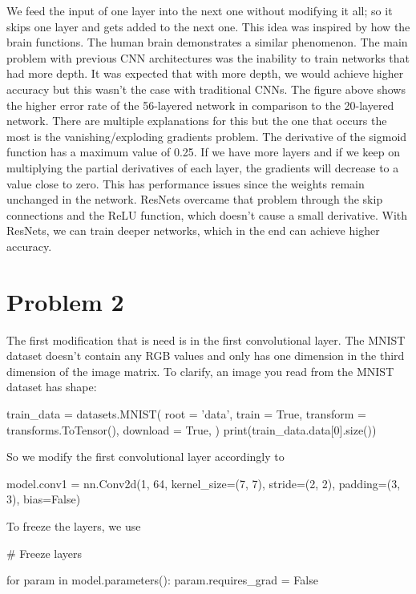 \documentclass{article}
\numberwithin{equation}{section}
\numberwithin{equation}{section}
\begin{document}
We feed the input of one layer into the next one without modifying it all; so it skips one layer and gets added to the next one. This idea was inspired by how the brain functions. The human brain demonstrates a similar phenomenon. The main problem with previous CNN architectures was the inability to train networks that had more depth. It was expected that with more depth, we would achieve higher accuracy but this wasn't the case with traditional CNNs. The figure above shows the higher error rate of the 56-layered network in comparison to the 20-layered network. There are multiple explanations for this but the one that occurs the most is the vanishing/exploding gradients problem. The derivative of the sigmoid function has a maximum value of 0.25. If we have more layers and if we keep on multiplying the partial derivatives of each layer, the gradients will decrease to a value close to zero. This has performance issues since the weights remain unchanged in the network. ResNets overcame that problem through the skip connections and the ReLU function, which doesn't cause a small derivative. With ResNets, we can train deeper networks, which in the end can achieve higher accuracy.





\section{Problem 2}
The first modification that is need is in the first convolutional layer. The MNIST dataset doesn't contain any RGB values and only has one dimension in the third dimension of the image matrix. To clarify, an image you read from the MNIST dataset has shape:
\begin{python}
train_data = datasets.MNIST(
    root = 'data',
    train = True,                         
    transform = transforms.ToTensor(), 
    download = True,            
)
print(train_data.data[0].size())

\end{python}
So we modify the first convolutional layer accordingly to 

\begin{python}
model.conv1 = nn.Conv2d(1, 64, kernel_size=(7, 7), stride=(2, 2), padding=(3, 3), bias=False)
\end{python}

To freeze the layers, we use 

\begin{python}
# Freeze layers

for param in model.parameters():
    param.requires_grad = False
\end{python}
\end{document}

